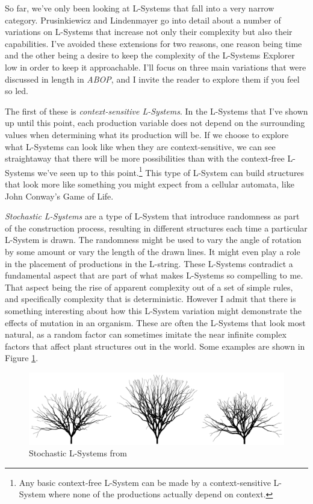 \documentclass[12pt,twoside]{reedthesis}
\begin{document}
So far, we've only been looking at L-Systems that fall into a very narrow category. Prusinkiewicz and Lindenmayer go into detail about a number of variations on L-Systems that increase not only their complexity but also their capabilities. I've avoided these extensions for two reasons, one reason being time and the other being a desire to keep the complexity of the L-Systems Explorer low in order to keep it approachable. I'll focus on three main variations that were discussed in length in \textit{ABOP}, and I invite the reader to explore them if you feel so led.

	The first of these is \textit{context-sensitive L-Systems}. In the L-Systems that I've shown up until this point, each production variable does not depend on the surrounding values when determining what its production will be. If we choose to explore what L-Systems can look like when they are context-sensitive, we can see straightaway that there will be more possibilities than with the context-free L-Systems we've seen up to this point.\footnote{Any basic context-free L-System can be made by a context-sensitive L-System where none of the productions actually depend on context.} This type of L-System can build structures that look more like something you might expect from a cellular automata, like John Conway's Game of Life.
	
	
	\textit{Stochastic L-Systems} are a type of L-System that introduce randomness as part of the construction process, resulting in different structures each time a particular L-System is drawn. The randomness might be used to vary the angle of rotation by some amount or vary the length of the drawn lines. It might even play a role in the placement of productions in the L-string. These L-Systems contradict a fundamental aspect that are part of what makes L-Systems so compelling to me. That aspect being the rise of apparent complexity out of a set of simple rules, and specifically complexity that is deterministic. However I admit that there is something interesting about how this L-System variation might demonstrate the effects of mutation in an organism. These are often the L-Systems that look most natural, as a random factor can sometimes imitate the near infinite complex factors that affect plant structures out in the world. Some examples are shown in Figure \ref{Stochastic}.
	
	\begin{figure}[H]
	\centering
	\includegraphics[width=0.8\linewidth]{Images/Stochastic}
	\caption{Stochastic L-Systems from \cite{LSystems2001}}
	\label{Stochastic}
	\end{figure}
	
\end{document}
